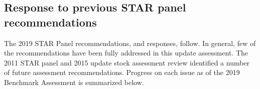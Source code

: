 \documentclass[11pt,
  english,
  a4paper,
]{article}
\begin{document}
\leavevmode\tagmcend\tagstructend\par


\hypertarget{response-to-previous-star-panel-recommendations}{%
\subsection{Response to previous STAR panel recommendations}\label{response-to-previous-star-panel-recommendations}}

\leavevmode\tagmcend\tagstructend


The 2019 STAR Panel recommendations, and responses, follow. In general, few of the recommendations have been fully addressed in this update assessment. The 2011 STAR panel and 2015 update stock assessment review identified a number of future assessment recommendations. Progress on each issue as of the 2019 Benchmark Assessment is summarized below.

\leavevmode\tagmcend\tagstructend\par
\end{document}

